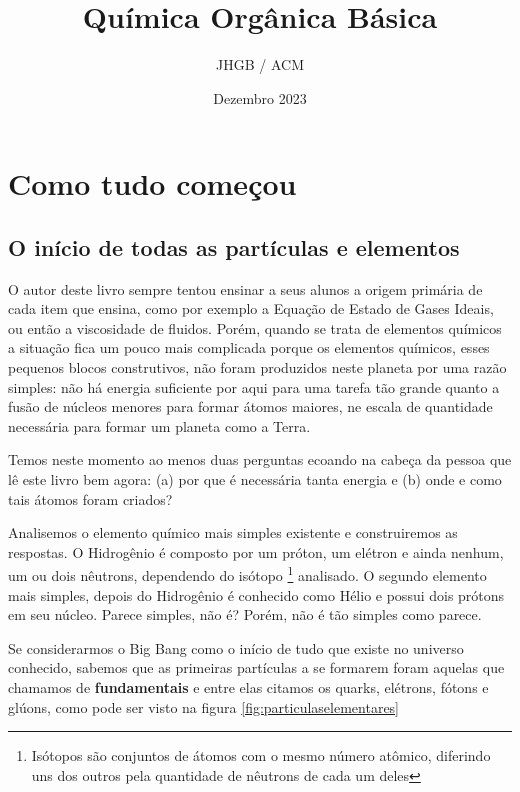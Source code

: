 \documentclass[a4paper,12pt]{book}
\begin{document}
\author{JHGB / ACM}
\title{Química Orgânica Básica}
\date{Dezembro 2023}

\frontmatter
\maketitle
\tableofcontents
\listoffigures 
\listoftables 


\mainmatter

\part{Como tudo começou}
\chapter{O início de todas as partículas e elementos}
O autor deste livro sempre tentou ensinar a seus alunos a origem primária de cada item que ensina, como por exemplo a Equação de Estado de Gases Ideais, ou então a viscosidade de fluidos. Porém, quando se trata de elementos químicos a situação fica um pouco mais complicada porque os elementos químicos, esses pequenos blocos construtivos, não foram produzidos neste planeta por uma razão simples: não há energia suficiente por aqui para uma tarefa tão grande quanto a fusão de núcleos menores para formar átomos maiores, ne escala de quantidade necessária para formar um planeta como a Terra.

Temos neste momento ao menos duas perguntas ecoando na cabeça da pessoa que lê este livro bem agora: (a) por que é necessária tanta energia e (b) onde e como tais átomos foram criados?

Analisemos o elemento químico mais simples existente e construiremos as respostas. O Hidrogênio é composto por um próton, um elétron e ainda nenhum, um ou dois nêutrons, dependendo do isótopo \footnote{Isótopos são conjuntos de átomos com o mesmo número atômico, diferindo uns dos outros pela quantidade de nêutrons de cada um deles} analisado. O segundo elemento mais simples, depois do Hidrogênio é conhecido como Hélio e possui dois prótons em seu núcleo. Parece simples, não é? Porém, não é tão simples como parece.

Se considerarmos o Big Bang como o início de tudo que existe no universo conhecido, sabemos que as primeiras partículas a se formarem foram aquelas que chamamos de \textbf{fundamentais} \cite{griffiths2020introduction} e entre elas citamos os quarks, elétrons, fótons e glúons, como pode ser visto na figura \ref{fig:particulaselementares}
\end{document}
